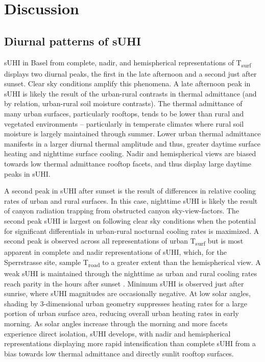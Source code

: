 \section{Discussion}

\subsection{Diurnal patterns of sUHI}

sUHI in Basel from complete, nadir, and hemispherical representations of T\textsubscript{surf} displays two diurnal peaks, the first in the late afternoon and a second just after sunset. Clear sky conditions amplify this phenomena. A late afternoon peak in sUHI is likely the result of the urban-rural contrasts in thermal admittance (and by relation, urban-rural soil moisture contrasts). The thermal admittance of many urban surfaces, particularly rooftops, tends to be lower than rural and vegetated environments \cite{Spronken-Smith1998} – particularly in temperate climates where rural soil moisture is largely maintained through summer. Lower urban thermal admittance manifests in a larger diurnal thermal amplitude and thus, greater daytime surface heating and nighttime surface cooling. Nadir and hemispherical views are biased towards low thermal admittance rooftop facets, and thus display large daytime peaks in sUHI.

A second peak in sUHI after sunset is the result of differences in relative cooling rates of urban and rural surfaces. In this case, nighttime sUHI is likely the result of canyon radiation trapping from obstructed canyon sky-view-factors. The second peak sUHI is largest on following clear sky conditions when the potential for significant differentials in urban-rural nocturnal cooling rates is maximized. A second peak is observed across all representations of urban T\textsubscript{surf} but is most apparent in complete and nadir representations of sUHI, which, for the Sperrstrasse site, sample T\textsubscript{road} to a greater extent than the hemispherical view. A weak sUHI is maintained through the nighttime as urban and rural cooling rates reach parity in the hours after sunset \cite{Oke2017}. Minimum sUHI is observed just after sunrise, where sUHI magnitudes are occasionally negative. At low solar angles, shading by 3-dimensional urban geometry suppresses heating rates for a large portion of urban surface area, reducing overall urban heating rates in early morning. As solar angles increase through the morning and more facets experience direct isolation, sUHI develops, with nadir and hemispherical representations displaying more rapid intensification than complete sUHI from a bias towards low thermal admittance and directly sunlit rooftop surfaces.

